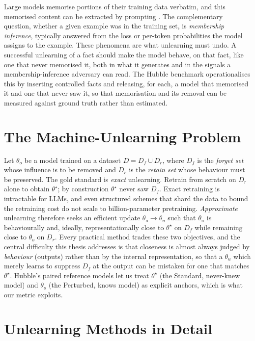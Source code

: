 Large models memorise portions of their training data verbatim, and this memorised content can be
extracted by prompting \citep{carlini2021extracting}. The complementary question, whether a given example
was in the training set, is \emph{membership inference}, typically answered from the loss or
per-token probabilities the model assigns to the example. These phenomena are what unlearning must undo. A
successful unlearning of a fact should make the model behave, on that fact, like one that never
memorised it, both in what it generates and in the signals a membership-inference adversary can read. The
Hubble benchmark operationalises this by inserting controlled facts and releasing, for each, a model that
memorised it and one that never saw it, so that memorisation and its removal can be measured against
ground truth rather than estimated.

\section{The Machine-Unlearning Problem}
\label{sec:bg-unlearning}

Let $\theta_o$ be a model trained on a dataset $D = D_f \cup D_r$, where $D_f$ is the \emph{forget set}
whose influence is to be removed and $D_r$ is the \emph{retain set} whose behaviour must be preserved.
The gold standard is \emph{exact} unlearning. Retrain from scratch on $D_r$ alone to obtain $\theta^\star$;
by construction $\theta^\star$ never saw $D_f$. Exact retraining is intractable for LLMs, and even
structured schemes that shard the data to bound the retraining cost \citep{bourtoule2021machine} do not
scale to billion-parameter pretraining. \emph{Approximate} unlearning therefore seeks an efficient update
$\theta_o \to \theta_u$ such that $\theta_u$ is behaviourally and, ideally, representationally close to
$\theta^\star$ on $D_f$ while remaining close to $\theta_o$ on $D_r$. Every practical method trades these
two objectives, and the central difficulty this thesis addresses is that closeness is almost always judged
by \emph{behaviour} (outputs) rather than by the internal representation, so that a $\theta_u$ which merely
learns to suppress $D_f$ at the output can be mistaken for one that matches $\theta^\star$. Hubble's paired
reference models let us treat $\theta^\star$ (the Standard, never-knew model) and $\theta_o$ (the
Perturbed, knows model) as explicit anchors, which is what our metric exploits.

\section{Unlearning Methods in Detail}
\label{sec:bg-methods}

